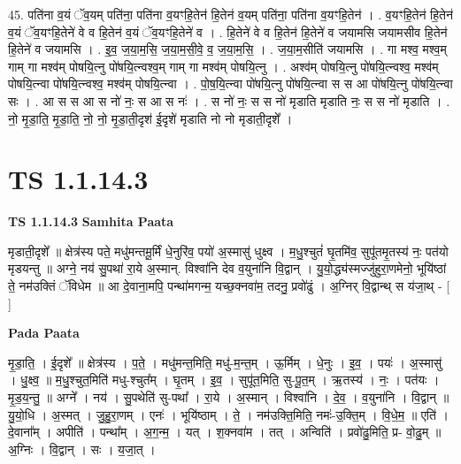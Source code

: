 \documentclass[17pt]{extarticle}
\begin{document}
45. पति॑ना व॒यं ॅव॒यम् पति॑ना॒ पति॑ना व॒यꣳहि॒तेन॑ हि॒तेन॑ व॒यम् पति॑ना॒ पति॑ना व॒यꣳहि॒तेन॑ । . व॒यꣳहि॒तेन॑ हि॒तेन॑ व॒यं ॅव॒यꣳहि॒तेने॑ वे व हि॒तेन॑ व॒यं ॅव॒यꣳहि॒तेने॑ व । . हि॒तेने॑ वे व हि॒तेन॑ हि॒तेने॑ व जयामसि जयामसीव हि॒तेन॑ हि॒तेने॑ व जयामसि । . इ॒व॒ ज॒या॒म॒सि॒ ज॒या॒म॒सी॒वे॒ व॒ ज॒या॒म॒सि॒ । . ज॒या॒म॒सीति॑ जयामसि । . गा मश्व॒ मश्व॒म् गाम् गा मश्व॑म् पोषयि॒त्नु पो॑षयि॒त्न्वश्व॒म् गाम् गा मश्व॑म् पोषयि॒त्नु । . अश्व॑म् पोषयि॒त्नु पो॑षयि॒त्न्वश्व॒ मश्व॑म् पोषयि॒त्न्वा पो॑षयि॒त्न्वश्व॒ मश्व॑म् पोषयि॒त्न्वा । . पो॒ष॒यि॒त्न्वा पो॑षयि॒त्नु पो॑षयि॒त्न्वा स स आ पो॑षयि॒त्नु पो॑षयि॒त्न्वा सः । . आ स स आ स नो॑ नः॒ स आ स नः॑ । . स नो॑ नः॒ स स नो॑ मृडाति मृडाति नः॒ स स नो॑ मृडाति । . नो॒ मृ॒डा॒ति॒ मृ॒डा॒ति॒ नो॒ नो॒ मृ॒डा॒ती॒दृश॑ ई॒दृशे॑ मृडाति नो नो मृडाती॒दृशे᳚ । \newline
\pagebreak
{}
\section*{ TS 1.1.14.3 }

\textbf{TS 1.1.14.3 } \newline
\textbf{Samhita Paata} \newline

मृडाती॒दृशे᳚ ॥ क्षेत्र॑स्य पते॒ मधु॑मन्तमू॒र्मिं धे॒नुरि॑व॒ पयो॑ अ॒स्मासु॑ धुक्ष्व । म॒धु॒श्चुतं॑ घृ॒तमि॑व॒ सुपू॑तमृ॒तस्य॑ नः॒ पत॑यो मृडयन्तु ॥ अग्ने॒ नय॑ सु॒पथा॑ रा॒ये अ॒स्मान्. विश्वा॑नि देव व॒युना॑नि वि॒द्वान् । यु॒यो॒द्ध्य॑स्मज्जु॑हुरा॒णमेनो॒ भूयि॑ष्ठां ते॒ नम॑उक्तिं ॅविधेम ॥ आ दे॒वाना॒मपि॒ पन्था॑मगन्म॒ यच्छ॒क्नवा॑म॒ तदनु॒ प्रवो॑ढुं । अ॒ग्निर् वि॒द्वान्थ् स य॑जा॒थ् - [ ] \newline

\textbf{Pada Paata} \newline

मृ॒डा॒ति॒ । ई॒दृशे᳚ ॥ क्षेत्र॑स्य । प॒ते॒ । मधु॑मन्त॒मिति॒ मधु॑-म॒न्त॒म् । ऊ॒र्मिम् । धे॒नुः । इ॒व॒ । पयः॑ । अ॒स्मासु॑ । धु॒क्ष्व॒ ॥ म॒धु॒श्चुत॒मिति॑ मधु-श्चुत᳚म् । घृ॒तम् । इ॒व॒ । सुपू॑त॒मिति॒ सु-पू॒त॒म् । ऋ॒तस्य॑ । नः॒ । पत॑यः । मृ॒ड॒य॒न्तु॒ ॥ अग्ने᳚ । नय॑ । सु॒पथेति॑ सु-पथा᳚ । रा॒ये । अ॒स्मान् । विश्वा॑नि । दे॒व॒ । व॒युना॑नि । वि॒द्वान् ॥ यु॒यो॒धि । अ॒स्मत् । जु॒हु॒रा॒णम् । एनः॑ । भूयि॑ष्ठाम् । ते॒ । नम॑उक्ति॒मिति॒ नमः॑-उ॒क्ति॒म् । वि॒धे॒म॒ ॥ एति॑ । दे॒वाना᳚म् । अपीति॑ । पन्था᳚म् । अ॒ग॒न्म॒ । यत् । श॒क्नवा॑म । तत् । अन्विति॑ । प्रवो॑ढु॒मिति॒ प्र- वो॒ढु॒म् ॥ अ॒ग्निः । वि॒द्वान् । सः । य॒जा॒त् ।  \newline
\end{document}
